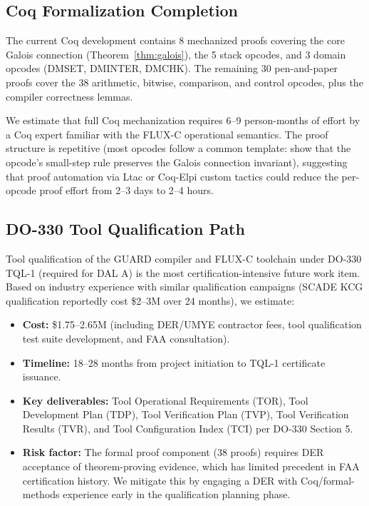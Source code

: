 \documentclass[conference]{IEEEtran}
\begin{document}
{%
\subsection{Coq Formalization Completion}
\label{sec:future-coq}

The current Coq development contains 8 mechanized proofs covering the
core Galois connection (Theorem~\ref{thm:galois}), the 5 stack opcodes,
and 3 domain opcodes (DMSET, DMINTER, DMCHK). The remaining 30
pen-and-paper proofs cover the 38 arithmetic, bitwise, comparison, and
control opcodes, plus the compiler correctness lemmas.

We estimate that full Coq mechanization requires 6--9 person-months
of effort by a Coq expert familiar with the FLUX-C operational
semantics. The proof structure is repetitive (most opcodes follow a
common template: show that the opcode's small-step rule preserves the
Galois connection invariant), suggesting that proof automation via
Ltac or Coq-Elpi custom tactics could reduce the per-opcode proof
effort from 2--3 days to 2--4 hours.

\subsection{DO-330 Tool Qualification Path}
\label{sec:future-do330}

Tool qualification of the GUARD compiler and FLUX-C toolchain under
DO-330 TQL-1 (required for DAL A) is the most certification-intensive
future work item. Based on industry experience with similar qualification
campaigns (SCADE KCG qualification reportedly cost \$2--3M over 24 months),
we estimate:

\begin{itemize}
  \item \textbf{Cost:} \$1.75--2.65M (including DER/UMYE contractor fees,
        tool qualification test suite development, and FAA consultation).
  \item \textbf{Timeline:} 18--28 months from project initiation to TQL-1
        certificate issuance.
  \item \textbf{Key deliverables:} Tool Operational Requirements (TOR),
        Tool Development Plan (TDP), Tool Verification Plan (TVP),
        Tool Verification Results (TVR), and Tool Configuration Index (TCI)
        per DO-330 Section 5.
  \item \textbf{Risk factor:} The formal proof component (38 proofs)
        requires DER acceptance of theorem-proving evidence, which has
        limited precedent in FAA certification history. We mitigate this
        by engaging a DER with Coq/formal-methods experience early in
        the qualification planning phase.
\end{itemize}

}
\end{document}
